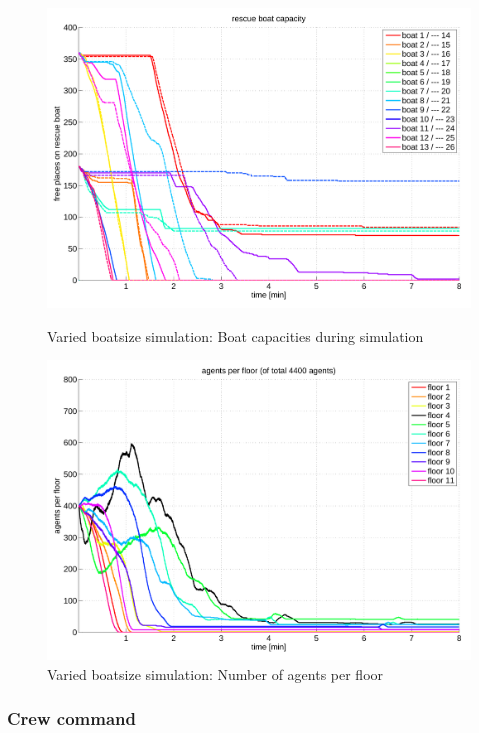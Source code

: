 \documentclass[11pt]{article}
\begin{document}
\begin{figure}[H]
\centering
{\begin{minipage}[t]{7.4cm}
\includegraphics[width=\textwidth]{pics/vary_cap.pdf}
\caption{Varied boatsize simulation: Boat capacities during simulation}
\end{minipage}}
{\begin{minipage}[t]{7.4cm}
\includegraphics[width=\textwidth]{pics/vary_agents.pdf}
\caption{Varied boatsize simulation: Number of agents per floor}
\end{minipage}}
\end{figure}



\subsubsection{Crew command}
\end{document}
